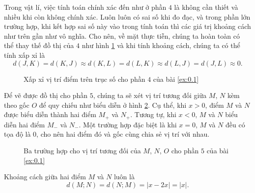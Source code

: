 Trong vật lí, việc tính toán chính xác đến như ở phần $4$ là không cần thiết và nhiều khi còn không chính xác. Luôn luôn có sai số khi đo đạc, và trong phần lớn trường hợp, khi kết hợp sai số này vào trong tính toán thì các giá trị khoảng cách như trên gần như vô nghĩa. Cho nên, về mặt thực tiễn, chúng ta hoàn toàn có thể thay thế đồ thị của $4$ như hình \ref{fig:do_thi:truc_so:truc_so_bon_xx} và khi tính khoảng cách, chúng ta có thể tính xấp xỉ là $$d(J,K) = d(K,J) \approx d(K,L) = d(L,K) \approx d(L,J) = d(J,L) \approx 0.$$

\begin{figure}[H]
   \centering
   \caption{Xấp xỉ vị trí điểm trên trục số cho phần $4$ của bài \ref{ex:0.1}}
   \label{fig:do_thi:truc_so:truc_so_bon_xx}
\end{figure}

Để vẽ được đồ thị cho phần $5$, chúng ta sẽ xét vị trí tương đối giữa $M$, $N$ kèm theo gốc $O$ để quy chiếu như biểu diễn ở hình \ref{fig:truc phan 5}. Cụ thể, khi $x>0$, điểm $M$ và $N$ được biểu diễn thành hai điểm $M_+$ và $N_+$. Tương tự, khi $x<0$, $M$ và $N$ biểu diễn hai điểm $M_-$ và $N_-$. Một trường hợp đặc biệt là khi $x=0$, $M$ và $N$ đều có tọa độ là $0$, cho nên hai điểm đó và gốc cùng chia sẻ vị trí với nhau.

\begin{figure}[H]
   \centering
   \caption{Ba trường hợp cho vị trí tương đối của $M$, $N$, $O$ cho phần $5$ của bài \ref{ex:0.1}}
   \label{fig:truc phan 5}
\end{figure}

Khoảng cách giữa hai điểm $M$ và $N$ luôn là $$d(M;N)=d(N;M)=|x-2x|=\boxed{|x|}.$$